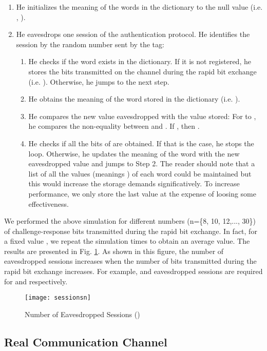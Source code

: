 \documentclass{article}
\begin{document}
\begin{enumerate}
  \item  He initializes the meaning of the words in the dictionary to the null value (i.e.  , ).
  \item  He eavesdrops one session of the authentication protocol. He identifies the session by the random number  sent by the tag:
      \begin{enumerate}
      \item He checks if the word  exists in the dictionary. If it is not registered, he stores the bits transmitted on the channel during the rapid bit exchange (i.e. ). Otherwise, he jumps to the next step.
      \item He obtains the meaning of the word  stored in the dictionary (i.e. ).
      \item He compares the new value eavesdropped with the value stored:
      For  to , he compares the non-equality between  and . If , then .
      \item He checks if all the bits of  are obtained. If that is the case, he stops the loop. Otherwise, he updates the meaning of the word  with the new eavesdropped value and jumps to Step 2. The reader should note that a list of all the values (meanings ) of each word  could be maintained but this would increase the storage demands significatively. To increase performance, we only store the last value at the expense of loosing some effectiveness.
    \end{enumerate}
\end{enumerate}

We performed the above simulation for different numbers (n=\{8, 10, 12,..., 30\}) of challenge-response bits transmitted during the rapid bit exchange.  In fact, for a fixed value , we repeat the simulation  times to obtain an average value. The results are presented in Fig. \ref{fig::fig2}. As shown in this figure, the number of eavesdropped sessions increases when the number of bits transmitted during the rapid bit exchange increases. For example,  and  eavesdropped sessions are required for  and  respectively.

\begin{figure}
\centering
\texttt{[image: sessionsn]}\\
  \caption{Number of Eavesdropped Sessions ()}\label{fig::fig2}
\end{figure}


\subsection{Real Communication Channel}
\end{document}

